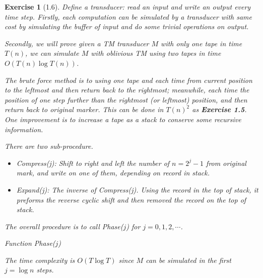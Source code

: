 \documentclass[a4paper]{article}
\newtheorem*{exercise}{Exercise}
\begin{document}
\begin{exercise}[1.6]
    Define a transducer: read an input and write an output every time step. 
    Firstly, each computation can be simulated by a transducer with same cost by 
    simulating the buffer of input and do some trivial operations on output.

    Secondly, we will prove given a TM transducer $M$ with only one tape in time $T(n)$, 
    we can simulate $M$ with oblivious TM using two tapes in time $O(T(n)\log T(n))$.

    The brute force method is to using one tape and each time from current position to the leftmost and 
    then return back to the rightmost; meanwhile, each time the position of one step further than 
    the rightmost (or leftmost) position, and then return back to original marker. 
    This can be done in $T(n)^{2}$ as \textbf{Exercise 1.5}. 
    One improvement is to increase a tape as a stack to conserve some recursive information.

    There are two sub-procedure.
    \begin{itemize}
        \item Compress(j): Shift to right and left the number of $n=2^{j}-1$ from original mark, 
            and write on one of them, depending on record in stack.
        \item Expand(j): The inverse of Compress(j). Using the record in the top of stack, 
            it preforms the reverse cyclic shift and then removed the record on the top of stack.
    \end{itemize}
    The overall procedure is to call Phase($j$) for $j=0,1,2,\cdots$.
    \begin{center}
    \begin{algorithm}[H]
    \caption{Function Phase($j$)}
    \end{algorithm}
    \end{center}
    The time complexity is $O(T\log T)$ since $M$ can be simulated in the first $j = \log n$ steps.
\end{exercise}
\end{document}
